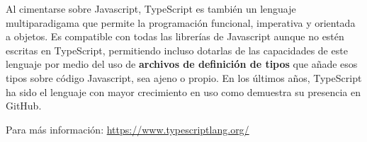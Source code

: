 Al cimentarse sobre Javascript, TypeScript es también un lenguaje multiparadigama que permite la programación funcional, imperativa y orientada a objetos. Es compatible con todas las librerías de Javascript aunque no estén escritas en TypeScript, permitiendo incluso dotarlas de las capacidades de este lenguaje por medio del uso de \textbf{archivos de definición de tipos} que añade esos tipos sobre código Javascript, sea ajeno o propio. En los últimos años, TypeScript ha sido el lenguaje con mayor crecimiento en uso como demuestra su presencia en GitHub\cite{octoverse2021}.

Para más información: \href{https://www.typescriptlang.org/}{https://www.typescriptlang.org/}